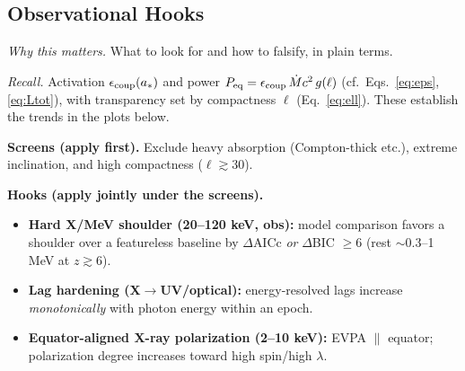 \documentclass[twocolumn]{aastex701}
\begin{document}
\clearpage
\subsection{Observational Hooks}\label{sec:obs}
\suppressfloats[t]  %

\noindent\textit{Why this matters.} What to look for and how to falsify, in plain terms.

\noindent\textit{Recall.}
Activation $\epsilon_{\rm coup}(a_\ast)$ and power $P_{\rm eq}=\epsilon_{\rm coup}\,\dot{M}c^2\,g(\ell)$
(cf.\ Eqs.~\eqref{eq:eps}, \eqref{eq:Ltot}), with transparency set by compactness $\ell$ (Eq.~\eqref{eq:ell}).
These establish the trends in the plots below.

\noindent\textbf{Screens (apply first).}
Exclude heavy absorption (Compton-thick etc.), extreme inclination, and high compactness ($\ell\!\gtrsim\!30$).

\noindent\textbf{Hooks (apply jointly under the screens).}
\begin{itemize}
  \item \textbf{Hard X/MeV shoulder (20--120 keV, obs):}
        model comparison favors a shoulder over a featureless baseline by
        $\Delta$AICc \emph{or} $\Delta$BIC $\ge 6$
        (rest $\sim$0.3--1 MeV at $z\gtrsim6$).
  \item \textbf{Lag hardening (X$\to$UV/optical):}
        energy-resolved lags increase \emph{monotonically} with photon energy within an epoch.
  \item \textbf{Equator-aligned X-ray polarization (2--10 keV):}
        EVPA $\parallel$ equator; polarization degree increases toward high spin/high $\lambda$.
\end{itemize}
\end{document}
